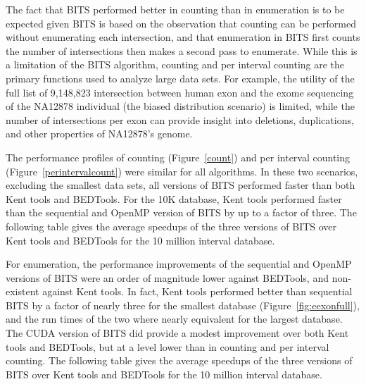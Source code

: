 \documentclass{bioinfo}
\begin{document}
		The fact that BITS performed better in counting than in enumeration is to be
		expected given BITS is based on the observation that counting can be
		performed without enumerating each intersection, and that enumeration in BITS
		first counts the number of intersections then makes a second pass to enumerate.
		While this is a limitation of the BITS algorithm, counting and per interval
		counting are the primary functions used to analyze large data sets.  For
		example, the utility of the full list of 9,148,823 intersection between human
		exon and the exome sequencing of the NA12878 individual (the biased distribution
		scenario) is limited, while the number of intersections per exon can provide
		insight into deletions, duplications, and other properties of NA12878's
		genome.
		
		The performance profiles of counting (Figure~\ref{count}) and per interval
		counting (Figure~\ref{perintervalcount}) were similar for all algorithms.
		In these two scenarios, excluding the smallest data sets, all versions of BITS
		performed faster than both Kent tools and BEDTools.  For the 10K database, Kent
		tools performed faster than the sequential and OpenMP version of BITS by up to a
		factor of three.  The following table gives the average speedups of the three
		versions of BITS over Kent tools and BEDTools for the 10 million interval
		database.
		
		For enumeration, the performance improvements of the  sequential and OpenMP
		versions of BITS were an order of magnitude lower against BEDTools, and
		non-existent against Kent tools.  In fact, Kent tools performed better than
		sequential BITS by a factor of nearly three for the smallest database
		(Figure~\ref{fig:eexonfull}), and the run times of the two where nearly
		equivalent for the largest database.  The CUDA version of BITS did provide a
		modest improvement over both Kent tools and BEDTools, but at a level lower than
		in counting and per interval counting.
		The following table  gives the average speedups of the three versions of BITS
		over Kent tools and BEDTools for the 10 million interval database.
\end{document}
